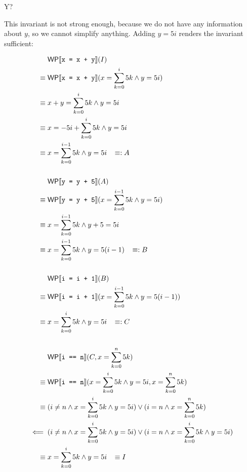 \documentclass[
  english
]{tumteaching}
\begin{document}
\begin{assignment}[L]{Y?}
\begin{solution}
\begin{enumerate}
		This invariant is not strong enough, because we do not have any information about $y$, so we cannot simplify anything. Adding $y = 5i$ renders the invariant sufficient:

		\begin{align*}
			&\;\textsf{WP}\llbracket{}\texttt{x = x + y}\rrbracket{}(I)\\
			\equiv&\;\textsf{WP}\llbracket{}\texttt{x = x + y}\rrbracket{}(x = \sum_{k=0}^{i} 5k \land y = 5i)\\
			\equiv&\;x + y = \sum_{k=0}^{i} 5k \land y = 5i\\
			\equiv&\;x = -5i + \sum_{k=0}^{i} 5k \land y = 5i\\
			\equiv&\;x = \sum_{k=0}^{i-1} 5k \land y = 5i \;\;\; \equiv: A\\
			&\\
			&\;\textsf{WP}\llbracket{}\texttt{y = y + 5}\rrbracket{}(A)\\
			\equiv&\;\textsf{WP}\llbracket{}\texttt{y = y + 5}\rrbracket{}(x = \sum_{k=0}^{i-1} 5k \land y = 5i)\\
			\equiv&\;x = \sum_{k=0}^{i-1} 5k \land y + 5 = 5i\\
			\equiv&\;x = \sum_{k=0}^{i-1} 5k \land y = 5(i-1) \;\;\; \equiv: B\\
			&\\
			&\;\textsf{WP}\llbracket{}\texttt{i = i + 1}\rrbracket{}(B)\\
			\equiv&\;\textsf{WP}\llbracket{}\texttt{i = i + 1}\rrbracket{}(x = \sum_{k=0}^{i-1} 5k \land y = 5(i-1))\\
			\equiv&\;x = \sum_{k=0}^{i} 5k \land y = 5i \;\;\; \equiv: C\\
			&\\
			&\;\textsf{WP}\llbracket{}\texttt{i == n}\rrbracket{}(C, x = \sum_{k=0}^{n} 5k)\\
			\equiv&\;\textsf{WP}\llbracket{}\texttt{i == n}\rrbracket{}(x = \sum_{k=0}^{i} 5k \land y = 5i, x = \sum_{k=0}^{n} 5k)\\
			\equiv&\;(i \neq n \land x = \sum_{k=0}^{i} 5k \land y = 5i) \lor (i = n \land x = \sum_{k=0}^{n} 5k)\\
			\impliedby&\;(i \neq n \land x = \sum_{k=0}^{i} 5k \land y = 5i) \lor (i = n \land x = \sum_{k=0}^{i} 5k \land y = 5i)\\
			\equiv&\;x = \sum_{k=0}^{i} 5k \land y = 5i \;\;\; \equiv I\\
		\end{align*}
	\end{enumerate}


\end{solution}
\end{assignment}
\end{document}
